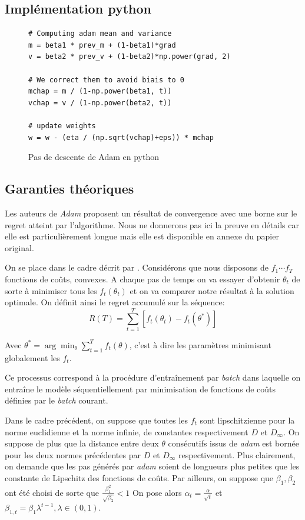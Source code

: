 \documentclass[fleqn,11pt, titlepage, french]{article}
\begin{document}
	\subsection{Implémentation python}
	
	\begin{figure}[H]
		\centering
\begin{verbatim}
# Computing adam mean and variance
m = beta1 * prev_m + (1-beta1)*grad
v = beta2 * prev_v + (1-beta2)*np.power(grad, 2)

# We correct them to avoid biais to 0
mchap = m / (1-np.power(beta1, t))
vchap = v / (1-np.power(beta2, t))

# update weights
w = w - (eta / (np.sqrt(vchap)+eps)) * mchap
		\end{verbatim}
		\caption{Pas de descente de Adam en python}
	\end{figure}

	\subsection{Garanties théoriques}
	
	Les auteurs de \emph{Adam} proposent un résultat de convergence avec une borne sur le regret atteint par l'algorithme. Nous ne donnerons pas ici la preuve en détails car elle est particulièrement longue mais elle est disponible en annexe du papier original\cite{adam}.
	
	On se place dans le cadre décrit par \cite{zinka}. Considérons que nous disposons de $f_1 \cdots f_T$ fonctions de coûts, convexes. A chaque pas de temps on va essayer d'obtenir $\theta_t$ de sorte à minimiser tous les $f_t(\theta_t)$ et on va comparer notre résultat à la solution optimale. On définit ainsi le regret accumulé sur la séquence:
	\[R(T)=\sum_{t=1}^{T}\left[f_{t}\left(\theta_{t}\right)-f_{t}\left(\theta^{*}\right)\right]\]
	
	Avec $\theta^* = \arg\min_{\theta} \sum_{t=1}^T f_t(\theta)$, c'est à dire les paramètres minimisant globalement les $f_t$.
	
	Ce processus correspond à la procédure d'entraînement par \emph{batch} dans laquelle on entraîne le modèle séquentiellement par minimisation de fonctions de coûts définies par le \emph{batch} courant.
	
	Dans le cadre précédent, on suppose que toutes les $f_t$ sont lipschitzienne pour la norme euclidienne et la norme infinie, de constantes respectivement $D$ et $D_\infty$. On suppose de plus que la distance entre deux $\theta$ consécutifs issus de \emph{adam} est bornée pour les deux normes précédentes par $D$ et $D_\infty$ respectivement. Plus clairement, on demande que les pas générés par \emph{adam} soient de longueurs plus petites que les constante de Lipschitz des fonctions de coûts. Par ailleurs, on suppose que $\beta_{1}, \beta_{2}$ ont été choisi de sorte que $\frac{\beta_{1}^{2}}{\sqrt{\beta_{2}}}<1$
	On pose alors $\alpha_{t}=\frac{\alpha}{\sqrt{t}}$ et $ \beta_{1, t}=\beta_{1} \lambda^{t-1}, \lambda \in(0,1)$. 
	
\end{document}
